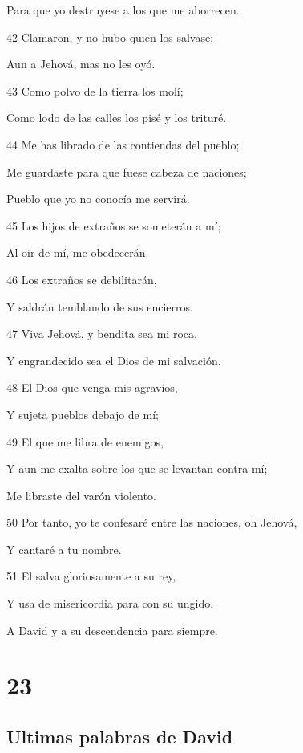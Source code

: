 \par Para que yo destruyese a los que me aborrecen.
\par 42 Clamaron, y no hubo quien los salvase;
\par Aun a Jehová, mas no les oyó.
\par 43 Como polvo de la tierra los molí;
\par Como lodo de las calles los pisé y los trituré.
\par 44 Me has librado de las contiendas del pueblo;
\par Me guardaste para que fuese cabeza de naciones;
\par Pueblo que yo no conocía me servirá.
\par 45 Los hijos de extraños se someterán a mí;
\par Al oir de mí, me obedecerán.
\par 46 Los extraños se debilitarán,
\par Y saldrán temblando de sus encierros.
\par 47 Viva Jehová, y bendita sea mi roca,
\par Y engrandecido sea el Dios de mi salvación.
\par 48 El Dios que venga mis agravios,
\par Y sujeta pueblos debajo de mí;
\par 49 El que me libra de enemigos,
\par Y aun me exalta sobre los que se levantan contra mí;
\par Me libraste del varón violento.
\par 50 Por tanto, yo te confesaré entre las naciones, oh Jehová,
\par Y cantaré a tu nombre. 
\par 51 El salva gloriosamente a su rey,
\par Y usa de misericordia para con su ungido,
\par A David y a su descendencia para siempre.

\chapter{23}

\section*{Ultimas palabras de David}

